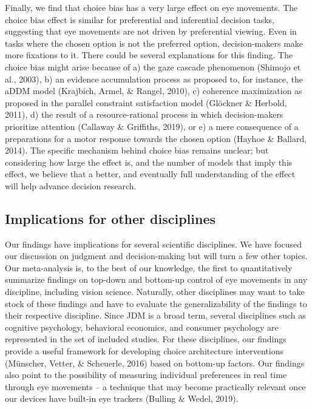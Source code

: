 \documentclass{article}
\begin{document}
Finally, we find that choice bias has a very large effect on eye movements. The choice bias effect is similar for preferential and inferential decision tasks, suggesting that eye movements are not driven by preferential viewing. Even in tasks where the chosen option is not the preferred option, decision-makers make more fixations to it. There could be several explanations for this finding. The choice bias might arise because of  a) the gaze cascade phenomenon (Shimojo et al., 2003), b) an evidence accumulation process as proposed to, for instance, the aDDM model (Krajbich, Armel, \& Rangel, 2010), c) coherence maximization as proposed in the parallel constraint satisfaction model (Glöckner \& Herbold, 2011), d) the result of a resource-rational process in which decision-makers prioritize attention (Callaway \& Griffiths, 2019), or e) a mere consequence of a preparations for a motor response towards the chosen option (Hayhoe \& Ballard, 2014). The specific mechanism behind choice bias remains unclear; but considering how large the effect is, and the number of models that imply this effect, we believe that a better, and eventually full understanding of the effect will help advance decision research. 


\subsection{Implications for other disciplines}

Our findings have implications for several scientific disciplines. We have focused our discussion on judgment and decision-making but will turn a few other topics. Our meta-analysis is, to the best of our knowledge, the first to quantitatively summarize findings on top-down and bottom-up control of eye movements in any discipline, including vision science. Naturally, other disciplines may want to take stock of these findings and have to evaluate the generalizability of the findings to their respective discipline. Since JDM is a broad term, several disciplines such as cognitive psychology, behavioral economics, and consumer psychology are represented in the set of included studies. For these disciplines, our findings provide a useful framework for developing choice architecture interventions (Münscher, Vetter, \& Scheuerle, 2016) based on bottom-up factors. Our findings also point to the possibility of measuring individual preferences in real time through eye movements – a technique that may become practically relevant once our devices have built-in eye trackers (Bulling \& Wedel, 2019).    
\end{document}
